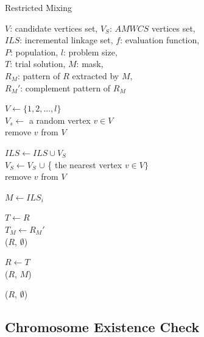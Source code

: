 \documentclass{sig-alternate-05-2015}
\begin{document}
\begin{algorithm}
\caption{Restricted Mixing}\label{algo_disjdecomp}

$V$: candidate vertices set, $V_S$: $AMWCS$ vertices set,  \\
$ILS$: incremental linkage set, $f$: evaluation function, \\
$P$: population, $l$: problem size, \\
$T$: trial solution, $M$: mask, \\
${R_M}$: pattern of $R$ extracted by $M$, \\
${R_M}'$: complement pattern of ${R_M}$


\BlankLine
$V \leftarrow \{ 1, 2, ..., l \}$ \\
$V_s \leftarrow$ a random vertex $v \in V$ \\
remove $v$ from $V$ \\

 {

    $ILS \leftarrow ILS \cup V_{S}$ \\
    $V_S \leftarrow V_S$ $\cup$ \{ the nearest vertex $v \in V \}$ \\
    remove $v$ from $V$ \\
}

\BlankLine
{} {

    $M \leftarrow ILS_i$ \\

     {

        $T \leftarrow R$ \\
        $T_M \leftarrow {R_M}'$ \\

         {
            \Return ($R$, $\emptyset$) 
        }

         {
            $R \leftarrow T$ \\
            \Return ($R$, $M$)
        }
    }
}
\Return ($R$, $\emptyset$) 
\end{algorithm}

\subsection{Chromosome Existence Check}
\end{document}
